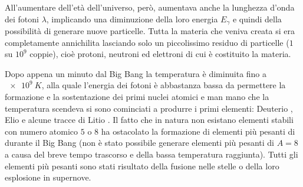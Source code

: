 All'aumentare dell'età dell'universo, però, aumentava anche la lunghezza d'onda dei fotoni $\lambda$, implicando una diminuzione della loro energia $E_\gamma$ e quindi della possibilità di generare nuove particelle. Tutta la materia che veniva creata si era completamente annichilita lasciando solo un piccolissimo residuo di particelle ($1$ su $10^9$ coppie), cioè protoni, neutroni ed elettroni di cui è costituito la materia. 

Dopo appena un minuto dal Big Bang la temperatura è diminuita fino a $\SI{e9}{K}$, alla quale l'energia dei fotoni è abbastanza bassa da permettere la formazione e la sostentazione dei primi nuclei atomici e man mano che la temperatura scendeva si sono cominciati a produrre i primi elementi: Deuterio , Elio  e alcune tracce di Litio . Il fatto che in natura non esistano elementi stabili con numero atomico $5$ o $8$ ha ostacolato la formazione di elementi più pesanti di  durante il Big Bang (non è stato possibile generare elementi più pesanti di $A=8$ a causa del breve tempo trascorso e della bassa temperatura raggiunta). Tutti gli elementi più pesanti sono stati risultato della fusione nelle stelle o della loro esplosione in supernove.

